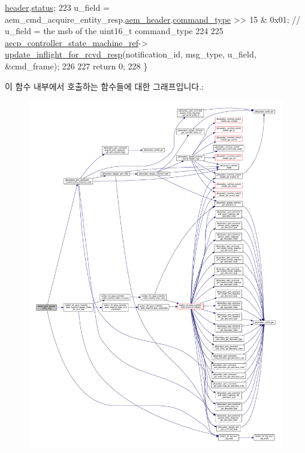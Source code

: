 \begin{DoxyCode}
      \hyperlink{structjdksavdecc__aecpdu__common_a314cacb6a61bcf18749030c0b6fb7510}{header}.\hyperlink{structjdksavdecc__aecpdu__common__control__header_ade818037fd6c985038ff29656089758d}{status};
223     u\_field = aem\_cmd\_acquire\_entity\_resp.\hyperlink{structjdksavdecc__aem__command__acquire__entity__response_ae1e77ccb75ff5021ad923221eab38294}{aem\_header}.\hyperlink{structjdksavdecc__aecpdu__aem_a07f7ee802870e9ae75f021832f59a8a9}{command\_type} >> 15 & 0x01; \textcolor{comment}{//
       u\_field = the msb of the uint16\_t command\_type}
224 
225     \hyperlink{namespaceavdecc__lib_a0b1b5aea3c0490f77cbfd9178af5be22}{aecp\_controller\_state\_machine\_ref}->
      \hyperlink{classavdecc__lib_1_1aecp__controller__state__machine_a997abd9786c330a5505e903e6443208e}{update\_inflight\_for\_rcvd\_resp}(notification\_id, msg\_type, u\_field, &cmd\_frame);
226 
227     \textcolor{keywordflow}{return} 0;
228 \}
\end{DoxyCode}


이 함수 내부에서 호출하는 함수들에 대한 그래프입니다.\+:
\nopagebreak
\begin{figure}[H]
\begin{center}
\leavevmode
\includegraphics[width=350pt]{classavdecc__lib_1_1descriptor__base__imp_ad248d7d7060e28eb36c8dc37d2653c43_cgraph}
\end{center}
\end{figure}




